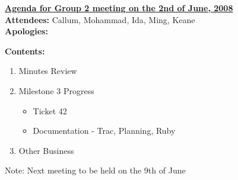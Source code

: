 \documentclass{letter}
\begin{document}
{\large \textbf{\underline{Agenda for Group 2 meeting on the 2nd of June, 2008}}}\\

\textbf{Attendees:} Callum, Mohammad, Ida, Ming, Keane\\
\textbf{Apologies:}

\textbf{Contents:}

\begin{enumerate}
\item Minutes Review
\item Milestone 3 Progress
	\begin{itemize}
	\item Ticket 42
	\item Documentation - Trac, Planning, Ruby
	\end{itemize}
\item Other Business
\end{enumerate}
 
Note: Next meeting to be held on the 9th of June
\end{document}
